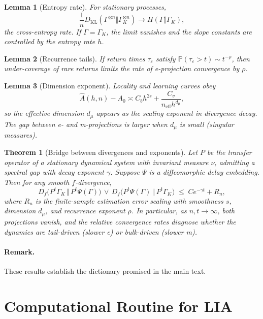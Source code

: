 \documentclass[11pt]{article}
\newtheorem{lemma}{Lemma}
\newtheorem{theorem}{Theorem}
\newcommand{\1}{\mathbf{1}}
\begin{document}
\begin{lemma}[Entropy rate]
For stationary processes,
\[
\frac{1}{n} D_{\mathrm{KL}}(\Gamma^{\otimes n}\Vert \Gamma_K^{\otimes n}) \to H(\Gamma \Vert \Gamma_K),
\]
the cross-entropy rate. If $\Gamma=\Gamma_K$, the limit vanishes and the slope constants are controlled by the entropy rate $h$.
\end{lemma}

\begin{lemma}[Recurrence tails]
If return times $\tau_\varepsilon$ satisfy $\mathbb P(\tau_\varepsilon > t) \sim t^{-\rho}$, then under-coverage of rare returns limits the rate of e-projection convergence by $\rho$.
\end{lemma}

\begin{lemma}[Dimension exponent]
Locality and learning curves obey
\[
\hat A(h,n)-A_0 \asymp C_b h^{2s} + \frac{C_v}{n_{\mathrm{eff}} h^{d_\mu}},
\]
so the effective dimension $d_\mu$ appears as the scaling exponent in divergence decay. The gap between e- and m-projections is larger when $d_\mu$ is small (singular measures).
\end{lemma}

\begin{theorem}[Bridge between divergences and exponents]
Let $P$ be the transfer operator of a stationary dynamical system with invariant measure $\nu$, admitting a spectral gap with decay exponent $\gamma$. Suppose $\Psi$ is a diffeomorphic delay embedding. Then for any smooth $f$-divergence,
\[
D_f\!\big(P^t\Gamma_K \,\Vert\, P^t\Psi(\Gamma)\big) \,\vee\, D_f\!\big(P^t\Psi(\Gamma)\,\Vert\, P^t\Gamma_K\big)
\;\le\; C e^{-\gamma t} + R_n,
\]
where $R_n$ is the finite-sample estimation error scaling with smoothness $s$, dimension $d_\mu$, and recurrence exponent $\rho$. In particular, as $n,t\to\infty$, both projections vanish, and the relative convergence rates diagnose whether the dynamics are tail-driven (slower e) or bulk-driven (slower m).
\end{theorem}

\paragraph{Remark.} These results establish the dictionary promised in the main text.

\section{Computational Routine for LIA}
\end{document}
